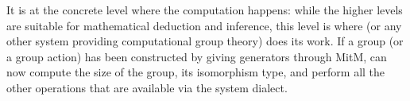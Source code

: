 It is at the concrete level where the computation happens: while the higher levels
are suitable for mathematical deduction and inference, this level is where \GAP
(or any other system providing computational group theory) does its work.
If a group (or a group action) has been constructed by giving generators
through MitM, \GAP can now compute the size of the group, its isomorphism type,
and perform all the other operations that are available via the \GAP system
dialect.

%







